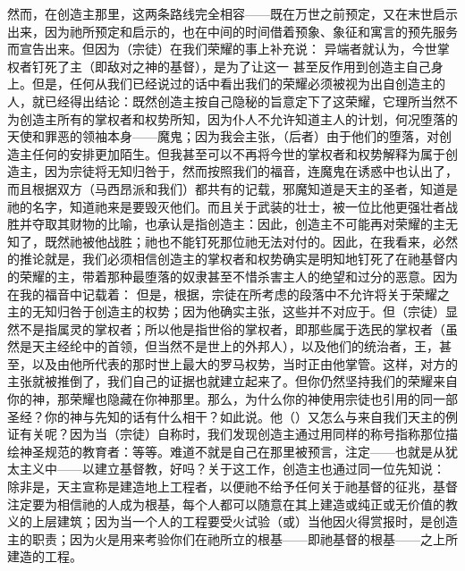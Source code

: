 然而，在创造主那里，这两条路线完全相容——既在万世之前预定，又在末世启示出来，因为祂所预定和启示的，也在中间的时间借着预象、象征和寓言的预先服务而宣告出来。但因为（宗徒）在我们荣耀的事上补充说： 异端者就认为，今世掌权者钉死了主（即敌对之神的基督），是为了让这一  甚至反作用到创造主自己身上。但是，任何从我们已经说过的话中看出我们的荣耀必须被视为出自创造主的人，就已经得出结论：既然创造主按自己隐秘的旨意定下了这荣耀，它理所当然不为创造主所有的掌权者和权势所知，因为仆人不允许知道主人的计划，何况堕落的天使和罪恶的领袖本身——魔鬼；因为我会主张，（后者）由于他们的堕落，对创造主任何的安排更加陌生。但我甚至可以不再将今世的掌权者和权势解释为属于创造主，因为宗徒将无知归咎于，然而按照我们的福音，连魔鬼在诱惑中也认出了，而且根据双方（马西昂派和我们）都共有的记载，邪魔知道是天主的圣者，知道是祂的名字，知道祂来是要毁灭他们。而且关于武装的壮士，被一位比他更强壮者战胜并夺取其财物的比喻，也承认是指创造主：因此，创造主不可能再对荣耀的主无知了，既然祂被他战胜；祂也不能钉死那位祂无法对付的。因此，在我看来，必然的推论就是，我们必须相信创造主的掌权者和权势确实是明知地钉死了在祂基督内的荣耀的主，带着那种最堕落的奴隶甚至不惜杀害主人的绝望和过分的恶意。因为在我的福音中记载着： 但是，根据，宗徒在所考虑的段落中不允许将关于荣耀之主的无知归咎于创造主的权势；因为他确实主张，这些并不对应于。但（宗徒）显然不是指属灵的掌权者；所以他是指世俗的掌权者，即那些属于选民的掌权者（虽然是天主经纶中的首领，但当然不是世上的外邦人），以及他们的统治者，王，甚至，以及由他所代表的那时世上最大的罗马权势，当时正由他掌管。这样，对方的主张就被推倒了，我们自己的证据也就建立起来了。但你仍然坚持我们的荣耀来自你的神，那荣耀也隐藏在你神那里。那么，为什么你的神使用宗徒也引用的同一部圣经？你的神与先知的话有什么相干？如此说。他（）又怎么与来自我们天主的例证有关呢？因为当（宗徒）自称时，我们发现创造主通过用同样的称号指称那位描绘神圣规范的教育者：等等。难道不就是自己在那里被预言，注定——也就是从犹太主义中——以建立基督教，好吗？关于这工作，创造主也通过同一位先知说： 除非是，天主宣称是建造地上工程者，以便祂不给予任何关于祂基督的征兆，基督注定要为相信祂的人成为根基，每个人都可以随意在其上建造或纯正或无价值的教义的上层建筑；因为当一个人的工程要受火试验（或）当他因火得赏报时，是创造主的职责；因为火是用来考验你们在祂所立的根基——即祂基督的根基——之上所建造的工程。 
